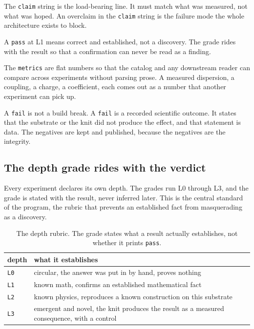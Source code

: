 The \texttt{claim} string is the load-bearing line. It must match what was measured, not what was hoped. An overclaim in the \texttt{claim} string is the failure mode the whole architecture exists to block.

\begin{principle}[No overclaim]
A \texttt{pass} at L1 means correct and established, not a discovery. The grade rides with the result so that a confirmation can never be read as a finding.
\end{principle}

The \texttt{metrics} are flat numbers so that the catalog and any downstream reader can compare across experiments without parsing prose. A measured dispersion, a coupling, a charge, a coefficient, each comes out as a number that another experiment can pick up.

A \texttt{fail} is not a build break. A \texttt{fail} is a recorded scientific outcome. It states that the substrate or the knit did not produce the effect, and that statement is data. The negatives are kept and published, because the negatives are the integrity.

\subsection{The depth grade rides with the verdict}

Every experiment declares its own depth. The grades run L0 through L3, and the grade is stated with the result, never inferred later. This is the central standard of the program, the rubric that prevents an established fact from masquerading as a discovery.

\begin{table}[ht]
\centering
\begin{tabular}{@{}ll@{}}
\toprule
depth & what it establishes \\
\midrule
\texttt{L0} & circular, the answer was put in by hand, proves nothing \\
\texttt{L1} & known math, confirms an established mathematical fact \\
\texttt{L2} & known physics, reproduces a known construction on this substrate \\
\texttt{L3} & emergent and novel, the knit produces the result as a measured consequence, with a control \\
\bottomrule
\end{tabular}
\caption{The depth rubric. The grade states what a result actually establishes, not whether it prints \texttt{pass}.}
\label{tab:depth}
\end{table}

